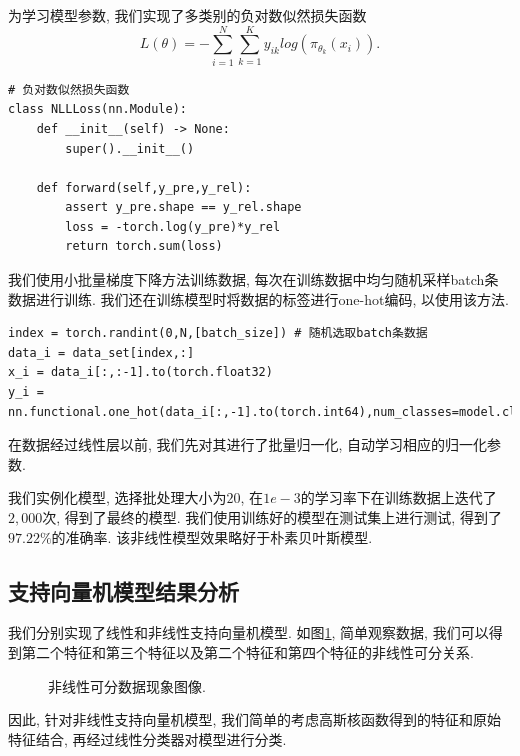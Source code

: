 为学习模型参数, 我们实现了多类别的负对数似然损失函数
\begin{equation}
    L(\theta) = -\sum_{i=1}^{N}\sum_{k=1}^{K}y_{ik}log(\pi_{\theta_k}(x_i)).
\end{equation}
\begin{lstlisting}
# 负对数似然损失函数
class NLLLoss(nn.Module):
    def __init__(self) -> None:
        super().__init__()
    
    def forward(self,y_pre,y_rel):
        assert y_pre.shape == y_rel.shape
        loss = -torch.log(y_pre)*y_rel
        return torch.sum(loss)
\end{lstlisting}

我们使用小批量梯度下降方法训练数据, 每次在训练数据中均匀随机采样batch条数据进行训练.
我们还在训练模型时将数据的标签进行one-hot编码, 以使用该方法. 
\begin{lstlisting}
index = torch.randint(0,N,[batch_size]) # 随机选取batch条数据
data_i = data_set[index,:]
x_i = data_i[:,:-1].to(torch.float32)
y_i = nn.functional.one_hot(data_i[:,-1].to(torch.int64),num_classes=model.class_num)
\end{lstlisting}
在数据经过线性层以前, 我们先对其进行了批量归一化, 自动学习相应的归一化参数.

我们实例化模型, 选择批处理大小为$20$, 在$1e-3$的学习率下在训练数据上迭代了$2,000$次, 得到了最终的模型.
我们使用训练好的模型在测试集上进行测试, 得到了$97.22\%$的准确率.
该非线性模型效果略好于朴素贝叶斯模型.

\subsection{支持向量机模型结果分析}
我们分别实现了线性和非线性支持向量机模型. 
如图\ref{figure1}, 简单观察数据, 我们可以得到第二个特征和第三个特征以及第二个特征和第四个特征的非线性可分关系.
\begin{figure}[htpb]
    \centering
    \caption{非线性可分数据现象图像.}
    \label{figure1}
\end{figure}
因此, 针对非线性支持向量机模型, 我们简单的考虑高斯核函数得到的特征和原始特征结合, 再经过线性分类器对模型进行分类.

